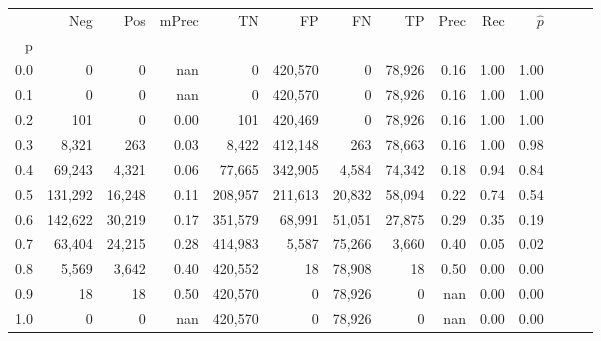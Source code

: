 \begin{tabular}{rrrrrrrrrrrrrr}
\toprule
{} &      Neg &     Pos & mPrec &       TN &       FP &      FN &      TP &  Prec &   Rec & $\hat{p}$ \\
p   &          &         &       &          &          &         &         &       &       &           \\
\midrule
0.0 &        0 &       0 &   nan &        0 &  420,570 &       0 &  78,926 &  0.16 &  1.00 &      1.00 \\
0.1 &        0 &       0 &   nan &        0 &  420,570 &       0 &  78,926 &  0.16 &  1.00 &      1.00 \\
0.2 &      101 &       0 &  0.00 &      101 &  420,469 &       0 &  78,926 &  0.16 &  1.00 &      1.00 \\
0.3 &    8,321 &     263 &  0.03 &    8,422 &  412,148 &     263 &  78,663 &  0.16 &  1.00 &      0.98 \\
0.4 &   69,243 &   4,321 &  0.06 &   77,665 &  342,905 &   4,584 &  74,342 &  0.18 &  0.94 &      0.84 \\
0.5 &  131,292 &  16,248 &  0.11 &  208,957 &  211,613 &  20,832 &  58,094 &  0.22 &  0.74 &      0.54 \\
0.6 &  142,622 &  30,219 &  0.17 &  351,579 &   68,991 &  51,051 &  27,875 &  0.29 &  0.35 &      0.19 \\
0.7 &   63,404 &  24,215 &  0.28 &  414,983 &    5,587 &  75,266 &   3,660 &  0.40 &  0.05 &      0.02 \\
0.8 &    5,569 &   3,642 &  0.40 &  420,552 &       18 &  78,908 &      18 &  0.50 &  0.00 &      0.00 \\
0.9 &       18 &      18 &  0.50 &  420,570 &        0 &  78,926 &       0 &   nan &  0.00 &      0.00 \\
1.0 &        0 &       0 &   nan &  420,570 &        0 &  78,926 &       0 &   nan &  0.00 &      0.00 \\
\bottomrule
\end{tabular}
